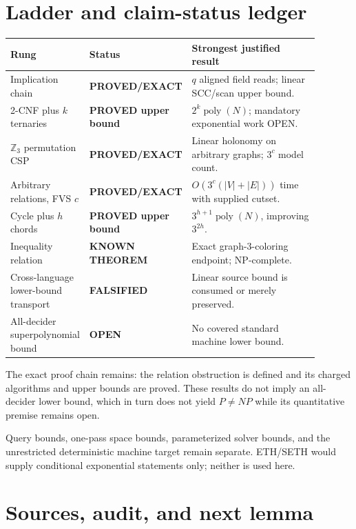 \documentclass[11pt]{article}
\begin{document}
\section{Ladder and claim-status ledger}

\begin{center}
\small
\begin{tabular}{p{0.25\linewidth}p{0.22\linewidth}p{0.42\linewidth}}
\toprule
Rung & Status & Strongest justified result \\
\midrule
Implication chain & \textbf{PROVED/EXACT} & $q$ aligned field reads;
linear SCC/scan upper bound.\\
2-CNF plus $k$ ternaries & \textbf{PROVED upper bound} &
$2^k\operatorname{poly}(N)$; mandatory exponential work OPEN.\\
$\mathbb Z_3$ permutation CSP & \textbf{PROVED/EXACT} &
Linear holonomy on arbitrary graphs; $3^c$ model count.\\
Arbitrary relations, FVS $c$ & \textbf{PROVED/EXACT} &
$O(3^c(|V|+|E|))$ time with supplied cutset.\\
Cycle plus $h$ chords & \textbf{PROVED upper bound} &
$3^{h+1}\operatorname{poly}(N)$, improving $3^{2h}$.\\
Inequality relation & \textbf{KNOWN THEOREM} & Exact graph-3-coloring
endpoint; NP-complete.\\
Cross-language lower-bound transport & \textbf{FALSIFIED} & Linear source
bound is consumed or merely preserved.\\
All-decider superpolynomial bound & \textbf{OPEN} & No covered standard
machine lower bound.\\
\bottomrule
\end{tabular}
\end{center}

The exact proof chain remains: the relation obstruction is defined and its
charged algorithms and upper bounds are proved.  These results do not imply
an all-decider lower bound, which in turn does not yield $P\ne NP$ while its
quantitative premise remains open.

Query bounds, one-pass space bounds, parameterized solver bounds, and the
unrestricted deterministic machine target remain separate.  ETH/SETH would
supply conditional exponential statements only; neither is used here.

\section{Sources, audit, and next lemma}
\end{document}
